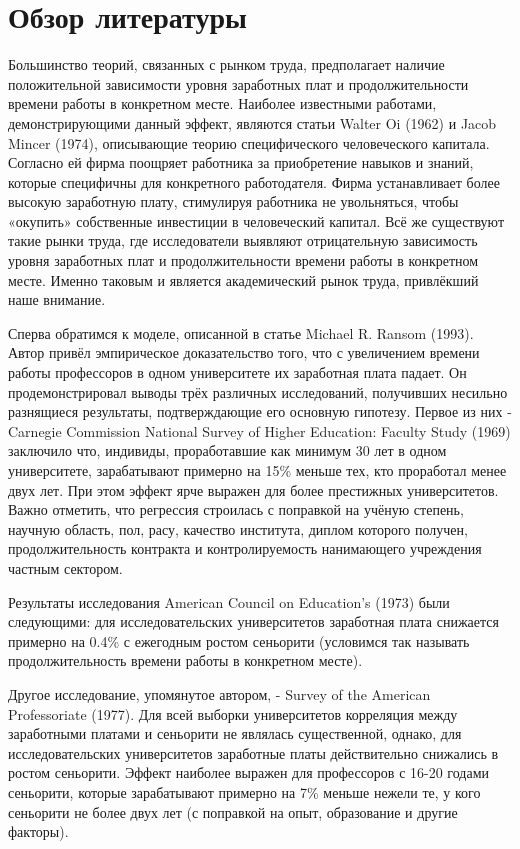 \documentclass[a4paper, 12pt]{article}
\theoremstyle{definition}
\theoremstyle{plain}
\begin{document}
\section{Обзор литературы}

Большинство теорий, связанных с рынком труда, предполагает наличие положительной зависимости уровня заработных плат и продолжительности времени работы в конкретном месте. Наиболее известными работами, демонстрирующими данный эффект, являются статьи Walter Oi (1962) и Jacob Mincer (1974), описывающие теорию специфического человеческого капитала. Согласно ей фирма поощряет работника за приобретение навыков и знаний, которые специфичны для конкретного работодателя. Фирма устанавливает более высокую заработную плату, стимулируя работника не увольняться, чтобы «окупить» собственные инвестиции в человеческий капитал. Всё же существуют такие рынки труда, где исследователи выявляют отрицательную зависимость уровня заработных плат и продолжительности времени работы в конкретном месте. Именно таковым и является академический рынок труда, привлёкший наше внимание.

Сперва обратимся к моделе, описанной в статье Michael R. Ransom (1993). Автор привёл эмпирическое доказательство того, что с увеличением времени работы профессоров в одном университете их заработная плата падает. Он продемонстрировал выводы трёх различных исследований, получивших несильно разнящиеся результаты, подтверждающие его основную гипотезу. Первое из них - Carnegie Commission National Survey of Higher Education: Faculty Study (1969) заключило что, индивиды, проработавшие как минимум 30 лет в одном университете, зарабатывают примерно на 15\%  меньше тех, кто проработал менее двух лет. При этом эффект ярче выражен для более престижных университетов. Важно отметить, что регрессия строилась с поправкой на учёную степень, научную область, пол, расу, качество института, диплом которого получен, продолжительность контракта и контролируемость нанимающего учреждения частным сектором. 

	Результаты исследования American Council on Education's (1973) были следующими:  для исследовательских университетов заработная плата снижается примерно на 0.4\% с ежегодным ростом сеньорити (условимся так называть продолжительность времени работы в конкретном месте). 
	
	Другое исследование, упомянутое автором, - Survey of the American Professoriate (1977). Для всей выборки университетов корреляция между заработными платами и сеньорити не являлась существенной, однако, для исследовательских университетов заработные платы действительно снижались в ростом сеньорити. Эффект наиболее выражен для профессоров с 16-20 годами сеньорити, которые зарабатывают примерно на 7\% меньше нежели те, у кого сеньорити не более двух лет (с поправкой на опыт, образование и другие факторы). 
	
\end{document}
